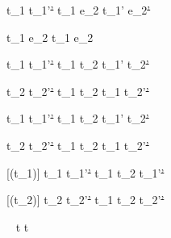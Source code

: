   {t_1\st{}  t_1'\st{'}}
  {t_1 \Next e_2\st{}  t_1' \Next e_2\st{'}}

  { }
  {t_1 \Next e_2\st{} \handle{\Continue} t_1 \Then e_2\st{}}


  {t_1\st{}  t_1'\st{'} }
  {t_1 \And t_2\st{}  t_1' \And t_2\st{'}}

  {t_2\st{}  t_2'\st{'} }
  {t_1\st{} \And t_2  t_1 \And t_2'\st{'}}


  {t_1\st{}  t_1'\st{'} }
  {t_1 \Or t_2\st{}  t_1' \Or t_2\st{'}}

  {t_2\st{}  t_2'\st{'} }
  {t_1\st{} \Or t_2  t_1 \Or t_2'\st{'}}


[\Failing(t_1)]
  {t_1\st{}  t_1'\st{'}}
  {t_1 \Xor t_2\st{}  t_1'\st{'}}

[\Failing(t_2)]
  {t_2\st{}  t_2'\st{'}}
  {t_1 \Xor t_2\st{}  t_2'\st{'}}

  {\ }
  {t\st{} \handle{\Pick \Here} t\st{}}











